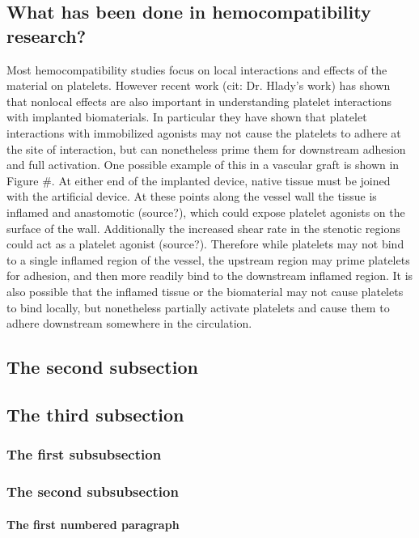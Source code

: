 \subsection{What has been done in hemocompatibility research?}
\label{sec:what-has-been}
Most hemocompatibility studies focus on local interactions and effects
of the material on platelets. However recent work (cit: Dr. Hlady's
work) has shown that nonlocal effects are also important in
understanding platelet interactions with implanted biomaterials. In
particular they have shown that platelet interactions with immobilized
agonists may not cause the platelets to adhere at the site of
interaction, but can nonetheless prime them for downstream adhesion
and full activation. One possible example of this in a vascular graft
is shown in Figure #. At either end of the implanted device, native
tissue must be joined with the artificial device. At these points
along the vessel wall the tissue is inflamed and anastomotic
(source?), which could expose platelet agonists on the surface of the
wall. Additionally the increased shear rate in the stenotic regions
could act as a platelet agonist (source?). Therefore while platelets
may not bind to a single inflamed region of the vessel, the upstream
region may prime platelets for adhesion, and then more readily bind to
the downstream inflamed region. It is also possible that the inflamed
tissue or the biomaterial may not cause platelets to bind locally, but
nonetheless partially activate platelets and cause them to adhere
downstream somewhere in the circulation.

\subsection{The second subsection}

\subsection{The third subsection}

\subsubsection{The first subsubsection}

\subsubsection{The second subsubsection}

\paragraph{The first numbered paragraph}

